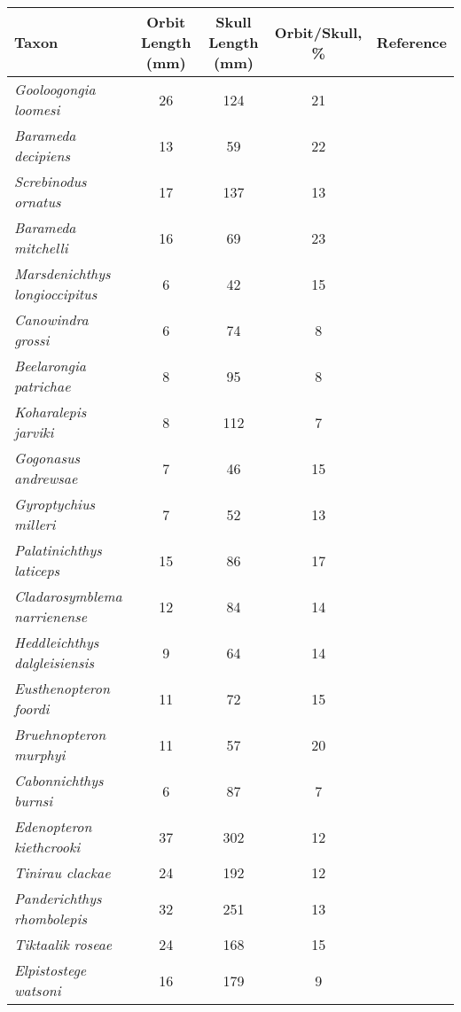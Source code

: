 \begin{tabular}{|l|c|c|c|c|}
\hline
\textbf{Taxon}&\textbf{Orbit Length (mm)}&\textbf{Skull Length (mm)}&\textbf{Orbit/Skull, \%}&\textbf{Reference}\\\hline
\textit{Gooloogongia loomesi}&26&124&21&\citet{Joha98a}\\\hline
\textit{Barameda decipiens}&13&59&22&\citet{Long89a}\\\hline
\textit{Screbinodus ornatus}&17&137&13&\citet{Jeff12a}\\\hline
\textit{Barameda mitchelli}&16&69&23&\citet{Jeff12a}\\\hline
\textit{Marsdenichthys longioccipitus}&6&42&15&\citet{Holl10a}\\\hline
\textit{Canowindra grossi}&6&74&8&\citet{Long85a}\\\hline
\textit{Beelarongia patrichae}&8&95&8&\citet{Long87a}\\\hline
\textit{Koharalepis jarviki}&8&112&7&\citet{Youn92a}\\\hline
\textit{Gogonasus andrewsae}&7&46&15&\citet{Long06a}\\\hline
\textit{Gyroptychius  milleri}&7&52&13&\citet{Newm15a}\\\hline
\textit{Palatinichthys laticeps}&15&86&17&\citet{Witz12a}\\\hline
\textit{Cladarosymblema narrienense}&12&84&14&\citet{Fox95a}\\\hline
\textit{Heddleichthys dalgleisiensis}&9&64&14&\citet{Snit09a}\\\hline
\textit{Eusthenopteron foordi}&11&72&15&\citet{Mark07a}\\\hline
\textit{Bruehnopteron  murphyi}&11&57&20&\citet{Schu12a}\\\hline
\textit{Cabonnichthys burnsi}&6&87&7&\citet{Ahlb97a}\\\hline
\textit{Edenopteron kiethcrooki}&37&302&12&\citet{Youn13a}\\\hline
\textit{Tinirau clackae}&24&192&12&\citet{Swar12a}\\\hline
\textit{Panderichthys rhombolepis}&32&251&13&\citet{Voro91a}\\\hline
\textit{Tiktaalik roseae}&24&168&15&\citet{Daes06a}\\\hline
\textit{Elpistostege watsoni}&16&179&9&\citet{Schu85a}\\\hline
\end{tabular}
